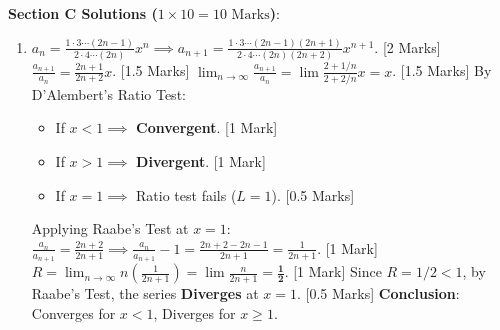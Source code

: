 \begin{solutionbox}
\medskip
\noindent\textbf{Section C Solutions ($1 \times 10 = 10\text{ Marks}$)}:
\begin{enumerate}[start=8]
    \item $a_n = \frac{1 \cdot 3 \cdots (2n-1)}{2 \cdot 4 \cdots (2n)} x^n \implies a_{n+1} = \frac{1 \cdot 3 \cdots (2n-1)(2n+1)}{2 \cdot 4 \cdots (2n)(2n+2)} x^{n+1}$. [2 Marks]
    $\frac{a_{n+1}}{a_n} = \frac{2n+1}{2n+2} x$. [1.5 Marks]
    $\lim_{n\to\infty} \frac{a_{n+1}}{a_n} = \lim \frac{2 + 1/n}{2 + 2/n} x = x$. [1.5 Marks]
    By D'Alembert's Ratio Test:
    \begin{itemize}
        \item If $x < 1 \implies$ \textbf{Convergent}. [1 Mark]
        \item If $x > 1 \implies$ \textbf{Divergent}. [1 Mark]
        \item If $x = 1 \implies$ Ratio test fails ($L=1$). [0.5 Marks]
    \end{itemize}
    Applying Raabe's Test at $x = 1$:
    $\frac{a_n}{a_{n+1}} = \frac{2n+2}{2n+1} \implies \frac{a_n}{a_{n+1}} - 1 = \frac{2n+2 - 2n - 1}{2n+1} = \frac{1}{2n+1}$. [1 Mark]
    $R = \lim_{n\to\infty} n\left(\frac{1}{2n+1}\right) = \lim \frac{n}{2n+1} = \mathbf{\frac{1}{2}}$. [1 Mark]
    Since $R = 1/2 < 1$, by Raabe's Test, the series \textbf{Diverges} at $x = 1$. [0.5 Marks]
    \textbf{Conclusion}: Converges for $x < 1$, Diverges for $x \ge 1$.
\end{enumerate}
\end{solutionbox}
